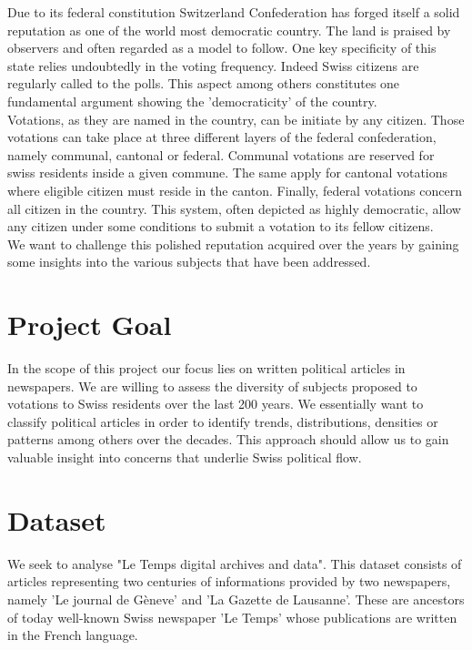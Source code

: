 \documentclass[11pt]{article}
\begin{document}
Due to its federal constitution Switzerland Confederation has forged itself
a solid reputation as one of the world most democratic country. The land is praised by observers and often
regarded as a model to follow. One key specificity of this state relies undoubtedly in the voting frequency.
Indeed Swiss citizens are regularly called to the polls. This aspect among others constitutes one fundamental
argument showing the 'democraticity' of the country.
\\
Votations, as they are named in the country, can be initiate by any citizen. Those votations can take place at
three different layers of the federal confederation, namely communal, cantonal or federal. Communal votations
are reserved for swiss residents inside a given commune. The same apply for cantonal votations where eligible citizen
must reside in the canton. Finally, federal votations concern all citizen in the country. This system, often
depicted as highly democratic, allow any citizen under some conditions to submit a votation to its fellow citizens.
\\
We want to challenge this polished reputation acquired over the years by gaining some insights into the various
subjects that have been addressed. 

\section{Project Goal}

In the scope of this project our focus lies on written political articles in newspapers. We are willing to assess 
the diversity of subjects proposed to votations to Swiss residents over the last 200 years. We essentially
want to classify political articles in order to identify trends, distributions, densities or patterns among 
others over the decades. This approach should allow us to gain valuable insight into concerns that underlie Swiss
political flow. 

\section{Dataset}

We seek to analyse "Le Temps digital archives and data". This dataset consists of articles representing two centuries of informations provided by two newspapers, namely 'Le journal de Gèneve' and 'La Gazette de Lausanne'. These are ancestors of today well-known Swiss newspaper 'Le Temps' whose publications are written in the French language.
\end{document}
